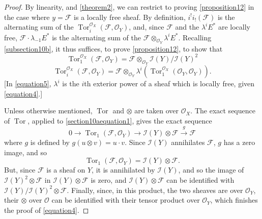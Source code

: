 \documentclass{article}
\theoremstyle{plain}
\theoremstyle{definition}
\newcommand{\sh}{\mathscr}
\DeclareMathOperator{\Tor}{Tor}
\newcommand{\oldpage}[1]{\marginpar{\footnotesize$\Big\vert$ \textit{p.~#1}}}
\begin{document}
\begin{proof}
  By linearity, and \cref{theorem2}, we can restrict to proving \cref{proposition12} in the case where $y=\sh{F}$ is a locally free sheaf.
  By definition, $i^!i_!(\sh{F})$ is the alternating sum of the $\Tor_i^{\sh{O}_X}(\sh{F},\sh{O}_Y)$, and, since $\sh{F}$ and the $\lambda^i E^*$ are locally free, $\sh{F}\cdot\lambda_{-1}E^*$ is the alternating sum of the $\sh{F}\otimes_{\sh{O}_Y}\lambda^i E^*$.
  Recalling \cref{subsection10b}, it thus suffices, to prove \cref{proposition12}, to show that
  \[
  \label{equation4}
    \Tor_1^{\sh{O}_X}(\sh{F},\sh{O}_Y)
    = \sh{F} \otimes_{\sh{O}_Y} \sh{I}(Y)/\sh{I}(Y)^2
    \tag{4}
  \]
  \[
  \label{equation5}
    \Tor_i^{\sh{O}_X}(\sh{F},\sh{O}_Y)
    = \sh{F} \otimes_{\sh{O}_Y} \lambda^i(\Tor_1^{\sh{O}_X}(\sh{O}_Y,\sh{O}_Y)).
    \tag{5}
  \]
  [In \cref{equation5}, $\lambda^i$ is the $i$th exterior power of a sheaf which is locally free, given \cref{equation4}.]

  Unless otherwise mentioned, $\Tor$ and $\otimes$ are taken over $\sh{O}_X$.
  The exact sequence of $\Tor$, applied to \cref{section10aequation1}, gives the exact sequence
  \[
    0 \to \Tor_1(\sh{F},\sh{O}_Y) \to \sh{I}(Y)\otimes\sh{F} \xrightarrow{g} \sh{F}
  \]
  where $g$ is defined by $g(u\otimes v)=u\cdot v$.
  Since $\sh{I}(Y)$ annihilates $\sh{F}$, $g$ has a zero image, and so
  \[
    \Tor_1(\sh{F},\sh{O}_Y) = \sh{I}(Y)\otimes\sh{F}.
  \]
  But, since $\sh{F}$ is a sheaf on $Y$, it is annihilated by $\sh{I}(Y)$, and so the image of $\sh{I}(Y)^2\otimes\sh{F}$ in $\sh{I}(Y)\otimes\sh{F}$ is zero, and $\sh{I}(Y)\otimes\sh{F}$ can be identified with $\sh{I}(Y)/\sh{I}(Y)^2\otimes\sh{F}$.
  Finally, since, in this product, the two sheaves are
\oldpage{123}
  over $\sh{O}_Y$, their $\otimes$ over $\sh{O}$ can be identified with their tensor product over $\sh{O}_Y$, which finishes the proof of \cref{equation4}.


\end{proof}
\end{document}
